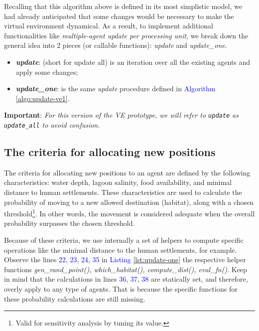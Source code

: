 Recalling that this algorithm above is defined in its most simplistic model, we had already anticipated that some changes would be necessary to make the virtual environment dynamical. As a result, to implement additional functionalities like \emph{multiple-agent update per processing unit}, we break down the general idea into 2 pieces (or callable functions): \emph{update} and \emph{update\_one}.
\begin{itemize}
    \item \textbf{\textit{update}}: (short for update all) is an iteration over all the existing agents and apply some changes;
    \item \textbf{\textit{update\_one}}: is the same \emph{update} procedure defined in \textcolor{blue}{Algorithm} \ref{algo:update-ve1}.
\end{itemize}
\noindent
\textbf{Important}: \textit{For this version of the VE prototype, we will refer to \texttt{update} as \texttt{update\_all} to avoid confusion.}

\subsection{The criteria for allocating new positions}
The criteria for allocating new positions to an agent are defined by the following characteristics: water depth, lagoon salinity, food availability, and minimal distance to human settlements. These characteristics are used to calculate the probability of moving to a new allowed destination (habitat), along with a chosen threshold\footnote{Valid for sensitivity analysis by tuning its value.}. In other words, the movement is considered adequate when the overall probability surpasses the chosen threshold.

Because of these criteria, we use internally a set of helpers to compute specific operations like the minimal distance to the human settlements, for example. Observe the lines \textcolor{blue}{22, 23, 24, 35} in \textcolor{blue}{Listing} \ref{lst:update-one} the respective helper functions \emph{gen\_rand\_point(), which\_habitat(), compute\_dist(), eval\_fn()}. Keep in mind that the calculations in lines \textcolor{blue}{36, 37, 38} are statically set, and therefore, overly apply to any type of agents. That is because the specific functions for these probability calculations are still missing.


